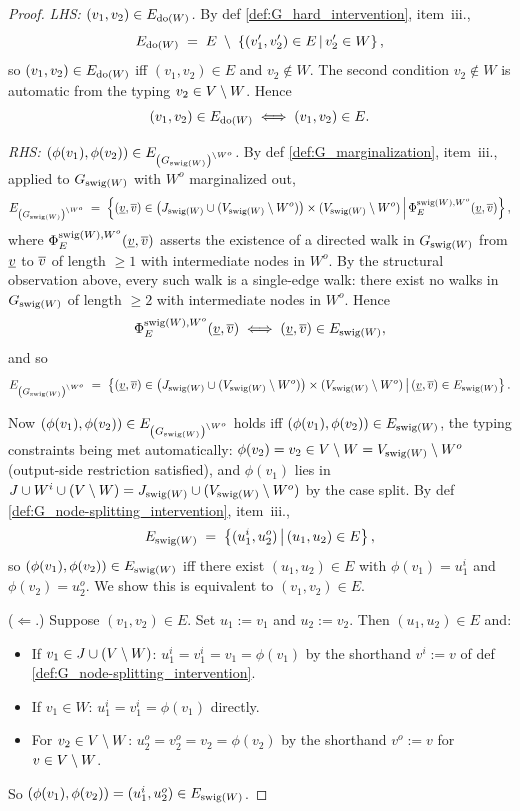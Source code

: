 \documentclass[main]{subfiles}
\begin{document}
\begin{proof}
\smallskip\noindent\emph{LHS: $(v_1, v_2) \in E_{\operatorname{do}(W)}$.} By def \ref{def:G_hard_intervention}, item~iii.,
\[
    E_{\operatorname{do}(W)} \;=\; E \;\setminus\; \left \{ (v_1', v_2') \in E \,\middle|\, v_2' \in W \right \},
\]
so $(v_1, v_2) \in E_{\operatorname{do}(W)}$ iff $(v_1, v_2) \in E$ and $v_2 \notin W$. The second condition $v_2 \notin W$ is automatic from the typing $v_2 \in V \setminus W$. Hence
\[
    (v_1, v_2) \in E_{\operatorname{do}(W)} \;\Longleftrightarrow\; (v_1, v_2) \in E.
\]

\smallskip\noindent\emph{RHS: $(\phi(v_1), \phi(v_2)) \in E_{\left ( G_{\mathrm{swig}(W)} \right )^{\setminus W^o}}$.} By def \ref{def:G_marginalization}, item~iii., applied to $G_{\mathrm{swig}(W)}$ with $W^o$ marginalized out,
\[
    E_{\left ( G_{\mathrm{swig}(W)} \right )^{\setminus W^o}} \;=\; \left \{ (\underline{v}, \overline{v}) \in \left ( J_{\mathrm{swig}(W)} \cup (V_{\mathrm{swig}(W)} \setminus W^o) \right ) \times (V_{\mathrm{swig}(W)} \setminus W^o) \,\middle|\, \Phi_E^{\mathrm{swig}(W), W^o}(\underline{v}, \overline{v}) \right \},
\]
where $\Phi_E^{\mathrm{swig}(W), W^o}(\underline{v}, \overline{v})$ asserts the existence of a directed walk in $G_{\mathrm{swig}(W)}$ from $\underline{v}$ to $\overline{v}$ of length $\ge 1$ with intermediate nodes in $W^o$. By the structural observation above, every such walk is a single-edge walk: there exist no walks in $G_{\mathrm{swig}(W)}$ of length $\ge 2$ with intermediate nodes in $W^o$. Hence
\[
    \Phi_E^{\mathrm{swig}(W), W^o}(\underline{v}, \overline{v}) \;\Longleftrightarrow\; (\underline{v}, \overline{v}) \in E_{\mathrm{swig}(W)},
\]
and so
\[
    E_{\left ( G_{\mathrm{swig}(W)} \right )^{\setminus W^o}} \;=\; \left \{ (\underline{v}, \overline{v}) \in \left ( J_{\mathrm{swig}(W)} \cup (V_{\mathrm{swig}(W)} \setminus W^o) \right ) \times (V_{\mathrm{swig}(W)} \setminus W^o) \,\middle|\, (\underline{v}, \overline{v}) \in E_{\mathrm{swig}(W)} \right \}.
\]

Now $(\phi(v_1), \phi(v_2)) \in E_{\left ( G_{\mathrm{swig}(W)} \right )^{\setminus W^o}}$ holds iff $(\phi(v_1), \phi(v_2)) \in E_{\mathrm{swig}(W)}$, the typing constraints being met automatically: $\phi(v_2) = v_2 \in V \setminus W = V_{\mathrm{swig}(W)} \setminus W^o$ (output-side restriction satisfied), and $\phi(v_1)$ lies in $J \cup W^i \cup (V \setminus W) = J_{\mathrm{swig}(W)} \cup (V_{\mathrm{swig}(W)} \setminus W^o)$ by the case split. By def \ref{def:G_node-splitting_intervention}, item~iii.,
\[
    E_{\mathrm{swig}(W)} \;=\; \left \{ (u_1^i, u_2^o) \,\middle|\, (u_1, u_2) \in E \right \},
\]
so $(\phi(v_1), \phi(v_2)) \in E_{\mathrm{swig}(W)}$ iff there exist $(u_1, u_2) \in E$ with $\phi(v_1) = u_1^i$ and $\phi(v_2) = u_2^o$. We show this is equivalent to $(v_1, v_2) \in E$.

\smallskip\noindent($\Leftarrow$.) Suppose $(v_1, v_2) \in E$. Set $u_1 := v_1$ and $u_2 := v_2$. Then $(u_1, u_2) \in E$ and:
\begin{itemize}
    \item If $v_1 \in J \cup (V \setminus W)$: $u_1^i = v_1^i = v_1 = \phi(v_1)$ by the shorthand $v^i := v$ of def \ref{def:G_node-splitting_intervention}.
    \item If $v_1 \in W$: $u_1^i = v_1^i = \phi(v_1)$ directly.
    \item For $v_2 \in V \setminus W$: $u_2^o = v_2^o = v_2 = \phi(v_2)$ by the shorthand $v^o := v$ for $v \in V \setminus W$.
\end{itemize}
So $(\phi(v_1), \phi(v_2)) = (u_1^i, u_2^o) \in E_{\mathrm{swig}(W)}$.


\end{proof}
\end{document}
